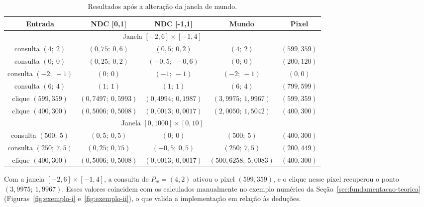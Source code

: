 \begin{table}[H]
    \centering
    \renewcommand{\arraystretch}{1.35}
    \small
    \begin{tabular}{c|c|c|c|c}
        \textbf{Entrada} & \textbf{NDC [0,1]} & \textbf{NDC [-1,1]} & \textbf{Mundo} & \textbf{Pixel} \\ \hline
        \multicolumn{5}{c}{Janela $[-2, 6] \times [-1, 4]$} \\ \hline
        consulta $(4;\ 2)$    & $(0{,}75;\ 0{,}6)$       & $(0{,}5;\ 0{,}2)$         & $(4;\ 2)$                 & $(599, 359)$ \\
        consulta $(0;\ 0)$    & $(0{,}25;\ 0{,}2)$       & $(-0{,}5;\ -0{,}6)$       & $(0;\ 0)$                 & $(200, 120)$ \\
        consulta $(-2;\ -1)$  & $(0;\ 0)$                & $(-1;\ -1)$               & $(-2;\ -1)$               & $(0, 0)$ \\
        consulta $(6;\ 4)$    & $(1;\ 1)$                & $(1;\ 1)$                 & $(6;\ 4)$                 & $(799, 599)$ \\
        clique $(599, 359)$   & $(0{,}7497;\ 0{,}5993)$  & $(0{,}4994;\ 0{,}1987)$   & $(3{,}9975;\ 1{,}9967)$   & $(599, 359)$ \\
        clique $(400, 300)$   & $(0{,}5006;\ 0{,}5008)$  & $(0{,}0013;\ 0{,}0017)$   & $(2{,}0050;\ 1{,}5042)$   & $(400, 300)$ \\ \hline
        \multicolumn{5}{c}{Janela $[0, 1000] \times [0, 10]$} \\ \hline
        consulta $(500;\ 5)$    & $(0{,}5;\ 0{,}5)$      & $(0;\ 0)$                 & $(500;\ 5)$               & $(400, 300)$ \\
        consulta $(250;\ 7{,}5)$ & $(0{,}25;\ 0{,}75)$   & $(-0{,}5;\ 0{,}5)$        & $(250;\ 7{,}5)$           & $(200, 449)$ \\
        clique $(400, 300)$     & $(0{,}5006;\ 0{,}5008)$ & $(0{,}0013;\ 0{,}0017)$  & $(500{,}6258;\ 5{,}0083)$ & $(400, 300)$
    \end{tabular}
    \caption{Resultados após a alteração da janela de mundo.}
    \label{tab:res-janela}
\end{table}

Com a janela $[-2, 6] \times [-1, 4]$, a consulta de $P_w = (4, 2)$ ativou o pixel $(599, 359)$, e o clique nesse pixel recuperou o ponto $(3{,}9975;\ 1{,}9967)$. Esses valores coincidem com os calculados manualmente no exemplo numérico da Seção~\ref{sec:fundamentacao-teorica} (Figuras~\ref{fig:exemplo-i} e~\ref{fig:exemplo-ii}), o que valida a implementação em relação às deduções.


